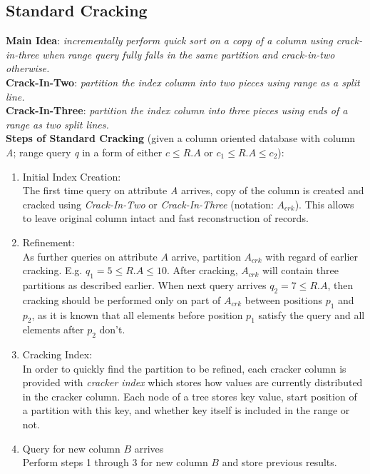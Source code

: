 \documentclass[10pt, conference, compsocconf]{IEEEtran}
\begin{document}
\subsection{Standard Cracking}
\textbf{Main Idea}: \textit{incrementally perform quick sort on a copy of a column using crack-in-three when range query fully falls in the same partition and crack-in-two otherwise.}\\

\textbf{Crack-In-Two}: \textit{partition the index column into two pieces using range as a split line.}\\

\textbf{Crack-In-Three}: \textit{partition the index column into three pieces using ends of a range as two split lines.}\\

\textbf{Steps of Standard Cracking} (given a column oriented database with column \textit{A}; range query \textit{q} in a form of either \textit{$c \leq R.A$} or \textit{$c_1 \leq R.A \leq c_2$}): \\
\begin{enumerate}
\item{Initial Index Creation:}\\
The first time query on attribute \textit{A} arrives, copy of the column is created and cracked using \emph{Crack-In-Two} or \emph{Crack-In-Three} (notation:  $A_{crk}$). This allows to leave original column intact and fast reconstruction of records. \\
\item{Refinement:}\\
As further queries on attribute $A$ arrive, partition $A_{crk}$ with regard of earlier cracking. E.g. $q_1 = 5 \leq R.A \leq 10$. After cracking, $A_{crk}$ will contain three partitions as described earlier. When next query arrives $q_2 = 7 \leq R.A$, then cracking should be performed only on part of $A_{crk}$ between positions $p_1$ and $p_2$, as it is known that all elements before position $p_1$ satisfy the query and all elements after $p_2$ don't.\\
\item{Cracking Index:}\\
In order to quickly find the partition to be refined, each cracker column is provided with \textit{cracker index} which stores how values are currently distributed in the cracker column. Each node of a tree stores key value, start position of a partition with this key, and whether key itself is included in the range or not.\\
\item{Query for new column $B$ arrives}\\
Perform steps 1 through 3 for new column $B$ and store previous results.
\end{enumerate}
\end{document}
